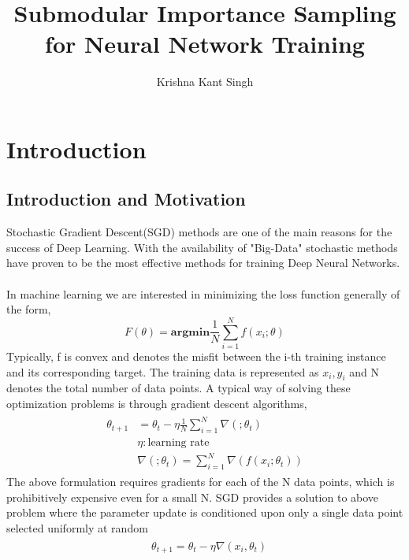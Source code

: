 \documentclass[a4paper,twoside]{iiththesis}
\title{Submodular Importance Sampling for Neural Network Training}
\author{Krishna Kant Singh}
\theoremstyle{definition}
\theoremstyle{definition}
\theoremstyle{remark}
\begin{document}
\part{Introduction}
\chapter{Introduction and Motivation}

Stochastic Gradient Descent(SGD) methods are one of the main reasons for the success of Deep Learning. With the availability of "Big-Data" stochastic methods have proven to be the most effective methods for training Deep Neural Networks. \\ \\ 
In machine learning we are interested in minimizing the loss function generally of the form,
\begin{equation*}
    F(\theta) = \textbf{argmin} \frac{1}{N} \sum_{i=1}^N  f(x_i; \theta)
\end{equation*}
Typically, f is convex and denotes the misfit between the i-th training instance and its corresponding target.
% 
% 
The training data is represented as ${x_i, y_i}$ and N denotes the total number of data points.
A typical way of solving these optimization problems is through gradient descent algorithms,
\begin{align}
\begin{split}
    \theta_{t+1}&=\theta_{t} - \eta \frac{1}{N}\sum_{i=1}^N \nabla( ; \theta_t)\\
                            &\eta: \text{learning rate}\\
                            & \nabla(; \theta_t) = \sum_{i=1}^N\nabla(f(x_i; \theta_{t}))
      \end{split}
\end{align}
The above formulation requires gradients for each of the N data points, which is prohibitively expensive even for a small N. SGD provides a solution to above problem where the parameter update is conditioned upon only a  single  data point selected uniformly at random
\begin{align}
\begin{split}
    &\theta_{t+1}=\theta_{t} -  \eta  \nabla(x_i, \theta_t) \\
\end{split}   
\end{align}
    
\end{document}
